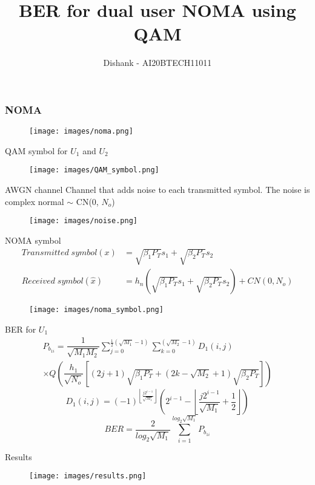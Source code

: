 \documentclass{beamer}
\title{BER for dual user NOMA using QAM}
\author{Dishank - AI20BTECH11011}
\date{}
\begin{document}
\begin{frame}
\titlepage
\end{frame}

\begin{frame}
\frametitle{NOMA}
\begin{figure}
    \centering
    \texttt{[image: images/noma.png]}
\end{figure}
\end{frame}

\begin{frame}{QAM symbol for $U_1$ and $U_2$}
    \begin{figure}
        \centering
        \texttt{[image: images/QAM\_symbol.png]}
    \end{figure}
\end{frame}

\begin{frame}{AWGN channel}
    Channel that adds noise to each transmitted symbol. The noise is complex normal $\sim$ CN(0, $N_o$)
    \begin{figure}
        \centering
        \texttt{[image: images/noise.png]}
    \end{figure}
\end{frame}

\begin{frame}{NOMA symbol}
    \vspace{-0.5cm}
    \begin{align}
        Transmitted\; symbol(x) &= \sqrt{\beta_1 P_T}s_1 + \sqrt{\beta_2 P_T}s_2\\
        Received\; symbol(\hat{x}) &= h_n(\sqrt{\beta_1 P_T}s_1 + \sqrt{\beta_2 P_T}s_2) + CN(0, N_o)
    \end{align}
    \begin{figure}
        \centering
        \texttt{[image: images/noma\_symbol.png]}
    \end{figure}
\end{frame}

\begin{frame}{BER for $U_1$}
    \begin{multline}
        P_{b_{1i}} = \dfrac{1}{\sqrt{M_1M_2}} \sum_{j = 0}^{\frac{1}{2}(\sqrt{M_1} - 1)} \sum_{k = 0}^{(\sqrt{M_2} - 1)} D_1(i,j)\\
        \times Q\left(\dfrac{h_1}{\sqrt{N_o}}\left[(2j+1)\sqrt{\beta_1P_T} + (2k - \sqrt{M_2} + 1)\sqrt{\beta_2P_T}\right]\right)
    \end{multline}
    \begin{equation}
        D_1(i,j) = (-1)^{\left \lfloor \frac{j2^{i-1}}{\sqrt{M_1}}\right \rfloor} \left(2^{i-1} - \left \lfloor\dfrac{j2^{i-1}}{\sqrt{M_1}} + \dfrac{1}{2} \right \rfloor\right)
    \end{equation}
    \begin{equation}
        BER = \dfrac{2}{log_2\sqrt{M_1}} \sum_{i=1}^{log_2\sqrt{M_1}} P_{b_{1i}}
    \end{equation}
\end{frame}

\begin{frame}{Results}
    \begin{figure}
        \centering
        \texttt{[image: images/results.png]}
    \end{figure}
\end{frame}
\end{document}
